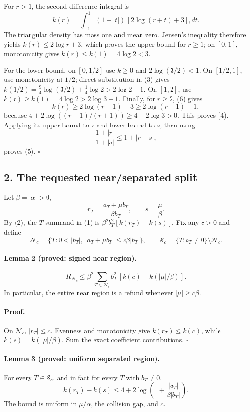 For \(r>1\), the second-difference integral is
\[
 k(r)=\int_{-1}^1(1-|t|)\,[2\log(r+t)+3],dt.                         \tag{6}
\]
The triangular density has mass one and mean zero.  Jensen's inequality
therefore yields \(k(r)\le2\log r+3\), which proves the upper bound for
\(r\ge1\); on \([0,1]\), monotonicity gives
\(k(r)\le k(1)=4\log2<3\).

For the lower bound, on \([0,1/2]\) use \(k\ge0\) and
\(2\log(3/2)<1\).  On \([1/2,1]\), use monotonicity at \(1/2\);
direct substitution in (3) gives
\(k(1/2)=\tfrac94\log(3/2)+\tfrac14\log2>2\log2-1\).
On \([1,2]\), use \(k(r)\ge k(1)=4\log2>2\log3-1\).  Finally, for
\(r\ge2\), (6) gives
\[
 k(r)\ge2\log(r-1)+3\ge2\log(r+1)-1,
\]
because \(4+2\log((r-1)/(r+1))\ge4-2\log3>0\).
This proves (4).  Applying its upper bound to \(r\) and lower bound to
\(s\), then using
\[
 \frac{1+|r|}{1+|s|}\le1+|r-s|,
\]
proves (5). \(\square\)

\subsection*{2. The requested near/separated split}

Let \(\beta=|\alpha|>0\),
\[
 r_T=\frac{a_T+\mu b_T}{\beta b_T},\qquad s=\frac{\mu}{\beta}.
\]
By (2), the \(T\)-summand in (1) is
\(\beta^2b_T^2[k(r_T)-k(s)]\).  Fix any \(c>0\) and define
\[
 \mathcal N_c=\{T:0<|b_T|,\ |a_T+\mu b_T|\le c\beta|b_T|\},
 \qquad \mathcal S_c=\{T:b_T\ne0\}\setminus\mathcal N_c.
\]

\paragraph{Lemma 2 (proved: signed near region).}
\[
 R_{\mathcal N_c}\le
 \beta^2\sum_{T\in\mathcal N_c}b_T^2\,[k(c)-k(|\mu|/\beta)].          \tag{7}
\]
In particular, the entire near region is a refund whenever
\(|\mu|\ge c\beta\).

\paragraph{Proof.}
On \(\mathcal N_c\), \(|r_T|\le c\).  Evenness and monotonicity give
\(k(r_T)\le k(c)\), while \(k(s)=k(|\mu|/\beta)\).  Sum the exact
coefficient contributions. \(\square\)

\paragraph{Lemma 3 (proved: uniform separated region).}
For every \(T\in\mathcal S_c\), and in fact for every \(T\) with
\(b_T\ne0\),
\[
 k(r_T)-k(s)\le4+2\log\left(1+\frac{|a_T|}{\beta|b_T|}\right).         \tag{8}
\]
The bound is uniform in \(\mu/\alpha\), the collision gap, and \(c\).

